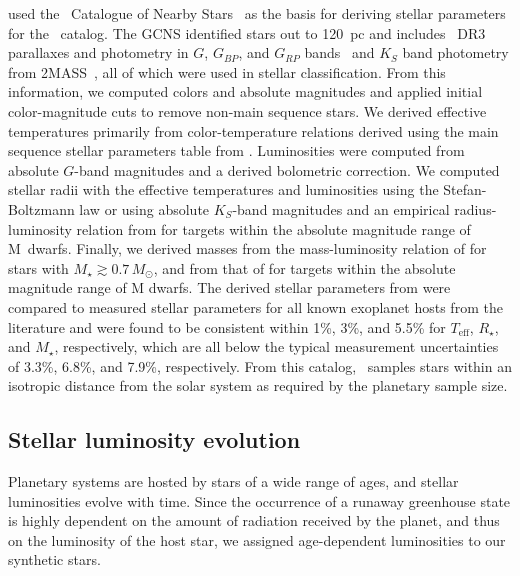 \documentclass[twocolumn,twocolappendix]{aastex631}
\begin{document}
\citet{Hardegree-Ullman2023} used the \gaia\ Catalogue of Nearby Stars~\citep[hereafter GCNS,][]{Smart2021} as the basis for deriving stellar parameters for the \bioverse\ catalog.
The GCNS identified stars out to 120~pc and includes \gaia\ DR3 parallaxes and photometry in $G$, $G_{BP}$, and $G_{RP}$ bands~\citep{GaiaCollaboration2022} and $K_S$ band photometry from 2MASS~\citep{Cutri2003}, all of which were used in stellar classification.
From this information, we computed colors and absolute magnitudes and applied initial color-magnitude cuts to remove non-main sequence stars.
We derived effective temperatures primarily from color-temperature relations derived using the main sequence stellar parameters table from \citet{Pecaut2013}.
Luminosities were computed from absolute $G$-band magnitudes and a derived bolometric correction.
We computed stellar radii with the effective temperatures and luminosities using the Stefan-Boltzmann law or using absolute $K_S$-band magnitudes and an empirical radius-luminosity relation from \citet{Mann2015} for targets within the absolute magnitude range of M~dwarfs.
Finally, we derived masses from the mass-luminosity relation of \citet{Torres2010} for stars with $M_{\star}\gtrsim 0.7\,M_{\odot}$, and from that of \citet{Mann2019} for targets within the absolute magnitude range of M dwarfs.
The derived stellar parameters from \citet{Hardegree-Ullman2023} were compared to measured stellar parameters for all known exoplanet hosts from the literature and were found to be consistent within 1\%, 3\%, and 5.5\% for $T_{\mathrm{eff}}$, $R_{\star}$, and $M_{\star}$, respectively, which are all below the typical measurement uncertainties of 3.3\%, 6.8\%, and 7.9\%, respectively.
From this catalog, \bioverse\ samples stars within an isotropic distance from the solar system as required by the planetary sample size.


\subsection{Stellar luminosity evolution}
Planetary systems are hosted by stars of a wide range of ages, and stellar luminosities evolve with time.
Since the occurrence of a runaway greenhouse state is highly dependent on the amount of radiation received by the planet, and thus on the luminosity of the host star, we assigned age-dependent luminosities to our synthetic stars.
\end{document}
